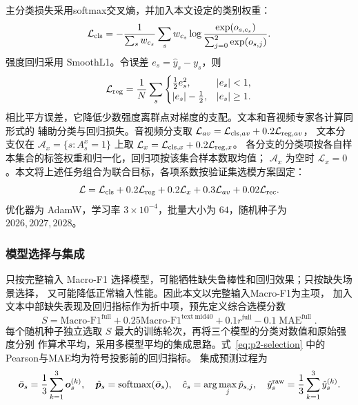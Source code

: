 \documentclass[bwprint]{gmcmthesis}
\begin{document}
主分类损失采用softmax交叉熵\citep{goodfellow2016deep}，并加入本文设定的类别权重：
\begin{equation}
 \mathcal L_{\rm cls}=-\frac{1}{\sum_s w_{c_s}}\sum_s w_{c_s}
 \log\frac{\exp(o_{s,c_s})}{\sum_{j=0}^{2}\exp(o_{s,j})}.
 \label{eq:p2-cls-loss}
\end{equation}
强度回归采用 SmoothL1\citep{girshick2015fast}。令误差 $e_s=\hat y_s-y_s$，则
\begin{equation}
 \mathcal L_{\rm reg}=\frac1N\sum_s
 \begin{cases}\frac12e_s^2,&|e_s|<1,\\|e_s|-\frac12,&|e_s|\ge1.
 \end{cases}
 \label{eq:p2-reg-loss}
\end{equation}
相比平方误差，它降低少数强度离群点对梯度的支配。文本和音视频专家各计算同形式的
辅助分类与回归损失。音视频分支取
$\mathcal L_{av}=\mathcal L_{{\rm cls},av}+0.2\mathcal L_{{\rm reg},av}$，
文本分支仅在 $\mathcal A_x=\{s:A_s^x=1\}$ 上取
$\mathcal L_x=\mathcal L_{{\rm cls},x}+0.2\mathcal L_{{\rm reg},x}$。
各分支的分类项按各自样本集合的标签权重和归一化，回归项按该集合样本数取均值；
$\mathcal A_x$ 为空时 $\mathcal L_x=0$。本文将上述任务组合为联合目标，各项系数按验证集选模方案固定：
\begin{equation}
 \mathcal L=\mathcal L_{\rm cls}+0.2\mathcal L_{\rm reg}
 +0.2\mathcal L_x+0.3\mathcal L_{av}+0.02\mathcal L_{\rm rec}.
 \label{eq:p2-total-loss}
\end{equation}
优化器为 AdamW\citep{loshchilov2019adamw}，学习率 $3\times10^{-4}$，批量大小为 $64$，随机种子为
$2026,2027,2028$。

\subsubsection{模型选择与集成}

只按完整输入 Macro-F1 选择模型，可能牺牲缺失鲁棒性和回归效果；只按缺失场景选择，
又可能降低正常输入性能。因此本文以完整输入Macro-F1为主项，
加入文本中部缺失表现及回归指标作为折中项，预先定义综合选模分数
\begin{equation}
 S=\text{Macro-F1}^{\mathrm{full}}
 +0.25\text{Macro-F1}^{\mathrm{text\ mid40}}
 +0.1r^{\mathrm{full}}-0.1\operatorname{MAE}^{\mathrm{full}}.
 \label{eq:p2-selection}
\end{equation}
每个随机种子独立选取 $S$ 最大的训练轮次，再将三个模型的分类对数值和原始强度分别
作算术平均，采用多模型平均的集成思路\citep{goodfellow2016deep}。式~\eqref{eq:p2-selection} 中的Pearson与MAE均为符号投影前的回归指标。
集成预测过程为
\[
 \bar{\boldsymbol o}_s=\frac13\sum_{k=1}^3\boldsymbol o_s^{(k)},\quad
 \hat{\boldsymbol p}_s=\operatorname{softmax}(\bar{\boldsymbol o}_s),\quad
 \hat c_s=\arg\max_j\hat p_{s,j},\quad
 \hat y_s^{\rm raw}=\frac13\sum_{k=1}^3\hat y_s^{(k)}.
\]
\end{document}
